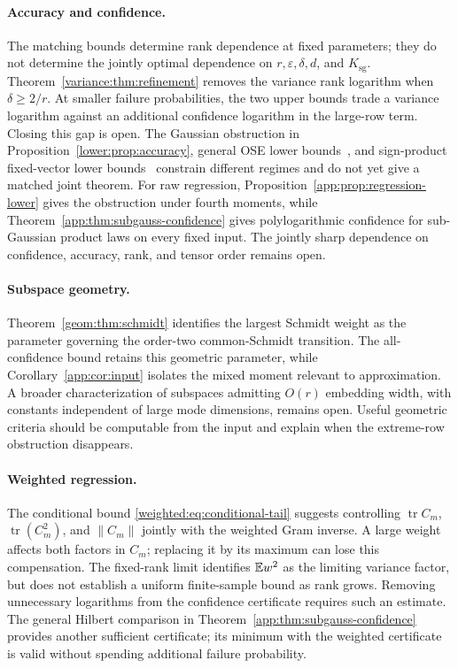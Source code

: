 \documentclass[11pt,a4paper]{article}
\theoremstyle{definition}\newtheorem{definition}[theorem]{Definition}
\theoremstyle{remark}\newtheorem{remark}[theorem]{Remark}
\numberwithin{equation}{section}
\newcommand{\Ksg}{{K_{\mathrm{sg}}}}\newcommand{\Cfour}{{C_4}}
\newcommand{\norm}[1]{\lVert#1\rVert}\newcommand{\ip}[2]{\langle#1,#2\rangle}
\DeclareMathOperator{\tr}{tr}\DeclareMathOperator{\rank}{rank}
\begin{document}
\paragraph{Accuracy and confidence.}
The matching bounds determine rank dependence at fixed parameters;
they do not determine the jointly optimal dependence on
$r,\varepsilon,\delta,d$, and $\Ksg$.
Theorem~\ref{variance:thm:refinement} removes the variance rank
logarithm when $\delta\ge2/r$. At smaller failure probabilities,
the two upper bounds trade a variance logarithm against an additional
confidence logarithm in the large-row term. Closing this gap is open.
The Gaussian obstruction in Proposition~\ref{lower:prop:accuracy},
general OSE lower bounds~\cite{NelsonNguyen2014}, and sign-product
fixed-vector lower bounds~\cite{MSW2019} constrain different regimes
and do not yet give a matched joint theorem. For raw regression,
Proposition~\ref{app:prop:regression-lower} gives the obstruction
under fourth moments, while Theorem~\ref{app:thm:subgauss-confidence}
gives polylogarithmic confidence for sub-Gaussian product laws on every
fixed input. The jointly sharp dependence on confidence, accuracy,
rank, and tensor order remains open.

\paragraph{Subspace geometry.}
Theorem~\ref{geom:thm:schmidt} identifies the largest Schmidt weight
as the parameter governing the order-two common-Schmidt transition.
The all-confidence bound retains this geometric parameter, while
Corollary~\ref{app:cor:input} isolates the mixed moment relevant to
approximation. A broader characterization of subspaces admitting $O(r)$ embedding
width, with constants independent of large mode dimensions, remains
open. Useful geometric criteria should be computable from the input
and explain when the extreme-row obstruction disappears.

\paragraph{Weighted regression.}
The conditional bound \eqref{weighted:eq:conditional-tail} suggests
controlling $\tr C_m$, $\tr(C_m^2)$, and $\norm{C_m}$ jointly with
the weighted Gram inverse. A large weight affects both factors in
$C_m$; replacing it by its maximum can lose this compensation.
The fixed-rank limit identifies $\mathbb E w^2$ as the limiting variance
factor, but does not establish a uniform finite-sample bound as rank
grows. Removing unnecessary logarithms from the confidence certificate
requires such an estimate. The general Hilbert comparison in
Theorem~\ref{app:thm:subgauss-confidence} provides another sufficient
certificate; its minimum with the weighted certificate is valid without
spending additional failure probability.
\end{document}
